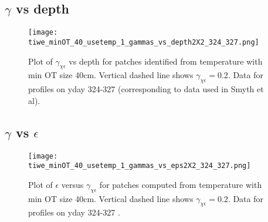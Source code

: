 \documentclass[11pt]{article}
\begin{document}
%
%
%
%
%
%
%
%








\clearpage
\subsection{$\gamma$ vs depth}


\begin{figure}[htbp]
\texttt{[image: tiwe\_minOT\_40\_usetemp\_1\_gammas\_vs\_depth2X2\_324\_327.png]}
\caption{Plot of $\gamma_{\chi\epsilon}$ vs depth for patches identified from temperature with min OT size 40cm. Vertical dashed line shows $\gamma_{\chi\epsilon}=0.2$. Data for profiles on yday 324-327 (corresponding to data used in Smyth et al).}
\label{patch_gam_vs_depth}
\end{figure}


\clearpage
\subsection{$\gamma$ vs $\epsilon$}


\begin{figure}[htbp]
\texttt{[image: tiwe\_minOT\_40\_usetemp\_1\_gammas\_vs\_eps2X2\_324\_327.png]}
\caption{Plot of $\epsilon$ versus $\gamma_{\chi\epsilon}$  for patches computed from temperature with min OT size 40cm. Vertical dashed line shows $\gamma_{\chi\epsilon}=0.2$. Data for profiles on yday 324-327 .}
\label{patch_gam_vs_eps}
\end{figure}
\end{document}
